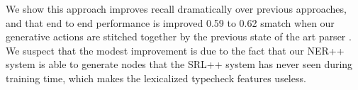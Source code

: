 \documentclass[11pt]{article}
\begin{document}
We show this approach improves recall dramatically over previous approaches, and that end to end performance is improved 0.59 to 0.62 smatch when our generative actions are stitched together by the previous state of the art parser \cite{key:2014flanigan-amr}.
We suspect that the modest improvement is due to the fact that our NER++ system is able to generate nodes that the SRL++ system has never seen during training time, which makes the lexicalized typecheck features useless.






\end{document}
